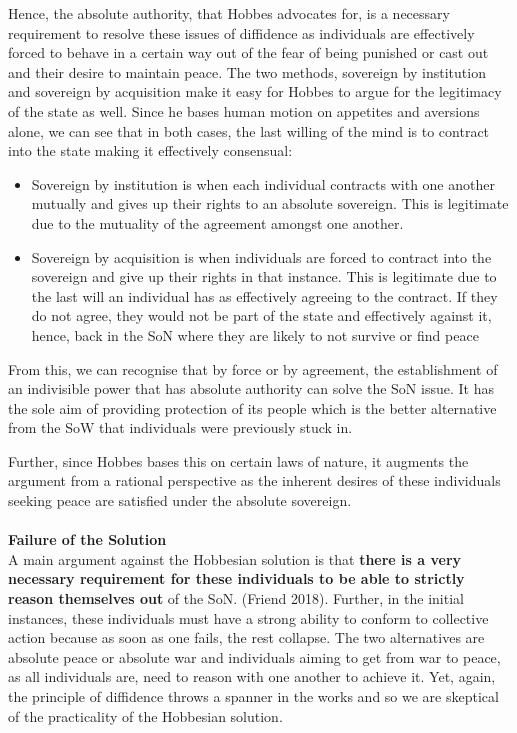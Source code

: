 \documentclass[12pt, letterpaper]{article}
\begin{document}
Hence, the absolute authority, that Hobbes advocates for, is a necessary requirement to resolve these issues of diffidence as individuals are effectively forced to behave in a certain way out of the fear of being punished or cast out and their desire to maintain peace. The two methods, sovereign by institution and sovereign by acquisition make it easy for Hobbes to argue for the legitimacy of the state as well. Since he bases human motion on appetites and aversions alone, we can see that in both cases, the last willing of the mind is to contract into the state making it effectively consensual:
\begin{itemize}
	\item Sovereign by institution is when each individual contracts with one another mutually and gives up their rights to an absolute sovereign. This is legitimate due to the mutuality of the agreement amongst one another.
	\item Sovereign by acquisition is when individuals are forced to contract into the sovereign and give up their rights in that instance. This is legitimate due to the last will an individual has as effectively agreeing to the contract. If they do not agree, they would not be part of the state and effectively against it, hence, back in the SoN where they are likely to not survive or find peace
\end{itemize}
From this, we can recognise that by force or by agreement, the establishment of an indivisible power that has absolute authority can solve the SoN issue. It has the sole aim of providing protection of its people which is the better alternative from the SoW that individuals were previously stuck in.

Further, since Hobbes bases this on certain laws of nature, it augments the argument from a rational perspective as the inherent desires of these individuals seeking peace are satisfied under the absolute sovereign.\\\\
\textbf{Failure of the Solution}\\
A main argument against the Hobbesian solution is that \textbf{there is a very necessary requirement for these individuals to be able to strictly reason themselves out} of the SoN. (Friend 2018). Further, in the initial instances, these individuals must have a strong ability to conform to collective action because as soon as one fails, the rest collapse. The two alternatives are absolute peace or absolute war and individuals aiming to get from war to peace, as all individuals are, need to reason with one another to achieve it. Yet, again, the principle of diffidence throws a spanner in the works and so we are skeptical of the practicality of the Hobbesian solution.
\end{document}
